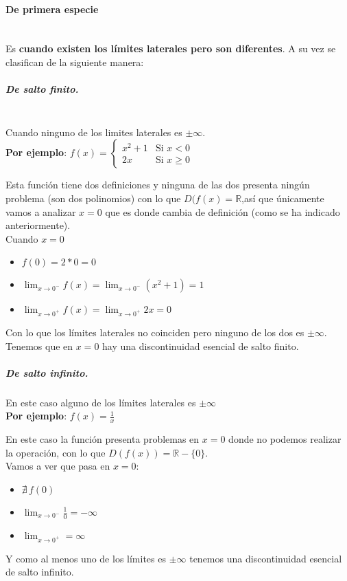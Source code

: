 \documentclass[a4paper,11pt,answers]{exam}
\begin{document}
\paragraph{De primera especie}\mbox{}\\
Es \textbf{cuando existen los límites laterales pero son diferentes}. A su vez se clasifican de la siguiente manera:
\subparagraph{De salto finito.}\mbox{}\\
Cuando ninguno de los limites laterales es $\pm\infty$.\\
\textbf{Por ejemplo}: $f(x) = \left\lbrace\begin{array}{ll}
x^2+ 1&\text{Si } x < 0\\
2x&\text{Si } x \geq 0
\end{array}\right.$\\
\begin{solution}
Esta función tiene dos definiciones y ninguna de las dos presenta ningún problema (son dos polinomios) con lo que $D(f(x) = \mathbb{R}$,así que únicamente vamos a analizar $x=0$ que es donde cambia de definición (como se ha indicado anteriormente).\\

Cuando $x=0$
\begin{itemize}
	\item $f(0) = 2*0 = 0$
	\item $\lim_{x \to 0^-} f(x) = \lim_{x \to 0^-} (x^2 + 1) = 1$
	\item $\lim_{x \to 0^+} f(x) = \lim_{x \to 0^+} 2x = 0$
\end{itemize}
Con lo que los límites laterales no coinciden pero ninguno de los dos es $\pm\infty$.\\

Tenemos que en $x=0$ hay una discontinuidad esencial de salto finito.
\end{solution}
\subparagraph{De salto infinito.}\mbox\\
En este caso alguno de los límites laterales es $\pm\infty$\\
\textbf{Por ejemplo}: $f(x) = \frac{1}{x}$\\
\begin{solution}
En este caso la función presenta problemas en $x=0$ donde no podemos realizar la operación, con lo que $D(f(x)) = \mathbb{R} - \{0\}$.\\
Vamos a ver que pasa en $x=0$:
\begin{itemize}
	\item $\nexists\,f(0)$
	\item $\lim_{x \to 0^-} \frac{1}{0} = -\infty$
	\item $\lim_{x \to 0^+} = \infty$
\end{itemize}
Y como al menos uno de los límites es $\pm\infty$ tenemos una discontinuidad esencial de salto infinito.
\end{solution}
\end{document}
